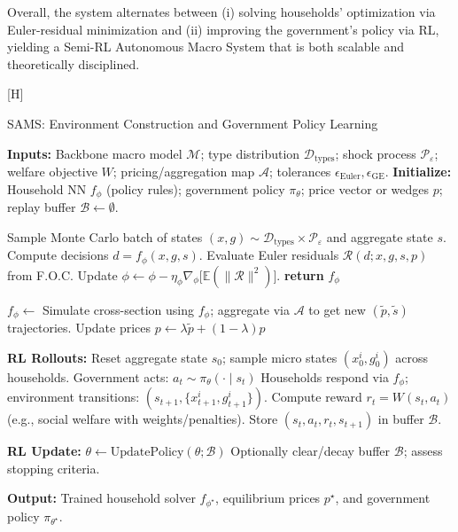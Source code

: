 \documentclass[11pt]{article}
\begin{document}
\medskip
\noindent
Overall, the system alternates between (i) solving households’ optimization via Euler-residual minimization and (ii) improving the government’s policy via RL, yielding a Semi-RL Autonomous Macro System that is both scalable and theoretically disciplined.

[H]
\caption{SAMS: Environment Construction and Government Policy Learning}
\label{alg:sams}
\begin{algorithmic}[1]
\State \textbf{Inputs:} Backbone macro model $\mathcal{M}$; type distribution $\mathcal{D}_{\text{types}}$; shock process $\mathcal{P}_{\varepsilon}$; welfare objective $W$; pricing/aggregation map $\mathcal{A}$; tolerances $\epsilon_{\text{Euler}}, \epsilon_{\text{GE}}$.
\State \textbf{Initialize:} Household NN $f_{\phi}$ (policy rules); government policy $\pi_{\theta}$; price vector or wedges $p$; replay buffer $\mathcal{B}\leftarrow\emptyset$.

\Statex
{}
  \Repeat
    \State Sample Monte Carlo batch of states $(x,g)\sim \mathcal{D}_{\text{types}}\times \mathcal{P}_{\varepsilon}$ and aggregate state $s$.
    \State Compute decisions $d=f_{\phi}(x,g,s)$.
    \State Evaluate Euler residuals $\mathcal{R}(d; x,g,s,p)$ from F.O.C.
    \State Update $\phi \leftarrow \phi - \eta_{\phi}\nabla_{\phi}\big[\mathbb{E}(\|\mathcal{R}\|^2)\big]$.
  \State \textbf{return} $f_{\phi}$
\EndFunction

\Statex
\Repeat {}
  \State $f_{\phi}\leftarrow$ 
  \State Simulate cross-section using $f_{\phi}$; aggregate via $\mathcal{A}$ to get new $(\tilde{p}, \tilde{s})$ trajectories.
    \State Update prices $p \leftarrow \lambda \tilde{p} + (1-\lambda)p$ 
  \EndIf

  \State \textbf{RL Rollouts:}
    \State Reset aggregate state $s_0$; sample micro states $(x^i_0,g^i_0)$ across households.
      \State Government acts: $a_t \sim \pi_{\theta}(\cdot \mid s_t)$ 
      \State Households respond via $f_{\phi}$; environment transitions: $(s_{t+1}, \{x^i_{t+1},g^i_{t+1}\})$.
      \State Compute reward $r_t = W(s_t,a_t)$ (e.g., social welfare with weights/penalties).
      \State Store $(s_t,a_t,r_t,s_{t+1})$ in buffer $\mathcal{B}$.
    \EndFor
  \EndFor

  \State \textbf{RL Update:} $\theta \leftarrow \text{UpdatePolicy}(\theta;\mathcal{B})$ 
  \State Optionally clear/decay buffer $\mathcal{B}$; assess stopping criteria.

\State \textbf{Output:} Trained household solver $f_{\phi^\star}$, equilibrium prices $p^\star$, and government policy $\pi_{\theta^\star}$.
\end{algorithmic}
\end{document}
